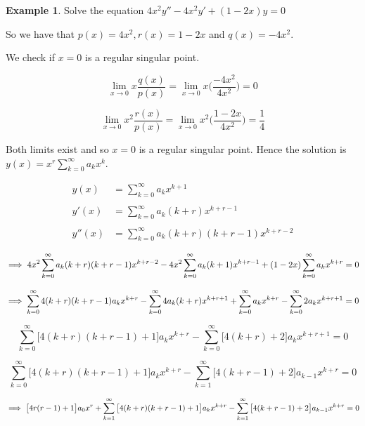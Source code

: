 \documentclass[11pt,a4paper]{article}
\theoremstyle{definition}
\newtheorem{exa}[thm]{Example}
\begin{document}
\begin{exa}


Solve the equation \hspace{0.3cm}$4x^2 y'' - 4x^2 y' + (1 -2x)y = 0$


So we have that $p(x) = 4x^2 , r(x) = 1-2x$ and $q(x) = -4x^2$.


We check if $x =0$ is a regular singular point.

$$\lim_{x \rightarrow 0} x \frac{q(x)}{p(x)} = \lim_{x \rightarrow 0} x\Bigg(\frac{-4x^2}{4x^2}\Bigg) = 0$$

$$\lim_{x \rightarrow 0} x^2 \frac{r(x)}{p(x)} = \lim_{x \rightarrow 0} x^2 \Bigg( \frac{1-2x}{4x^2}\Bigg) = \frac{1}{4}$$

Both limits exist and so $x = 0$ is a regular singular point. Hence the solution is $\displaystyle{y(x) = x^r \sum^{\infty}_{k=0} a_kx^k}$.

\begin{align*}
y(x) & = \sum^{\infty}_{k =0} a_kx^{k + 1}\\\\
y'(x)  & = \sum^{\infty}_{k = 0} a_k (k+r) x^{k+r -1}\\\\
y''(x) & =  \sum^{\infty}_{k = 0} a_k (k+r) (k+r -1) x^{k+r -2}
\end{align*}

$$\implies \hspace{0.0cm} 4x^2  \sum^{\infty}_{k = 0}a_k (k+r) (k + r - 1) x^{k + r -2} - 4x^2  \sum^{\infty}_{k = 0} a_k (k+1) x^{k + r -1} + (1-2x)  \sum^{\infty}_{k = 0} a_k x^{k + r} = 0$$

$$\implies \hspace{0.0cm}  \sum^{\infty}_{k = 0}4(k+ r)(k+r - 1) a_k x^{k+r} -  \sum^{\infty}_{k = 0} 4 a_k (k+r) x^{k + r + 1} +  \sum^{\infty}_{k = 0} a_k x^{k+ r} -  \sum^{\infty}_{k = 0}2a_k x^{k + r + 1} = 0$$

$$ \sum^{\infty}_{k = 0}\big[ 4(k+r)(k + r -1) + 1\big] a_k x^{k + r} -  \sum^{\infty}_{k = 0}\big[4(k+r) + 2\big] a_k x^{k+r + 1} = 0$$

$$ \sum^{\infty}_{k = 0}\big[4(k+r) (k+r-1) + 1\big] a_kx^{k +r} -  \sum^{\infty}_{k = 1}\big[4(k+r - 1 ) + 2\big] a_{k -1}x^{k + r} = 0$$

$$\implies \hspace{0.0cm} \big[4r(r-1)+1\big]a_0x^r + \sum^{\infty}_{k = 1}\big[4(k+r) (k+r-1) + 1\big] a_kx^{k +r} -  \sum^{\infty}_{k = 1}\big[4(k+r - 1 ) + 2\big] a_{k -1}x^{k + r} = 0$$


\end{exa}
\end{document}
